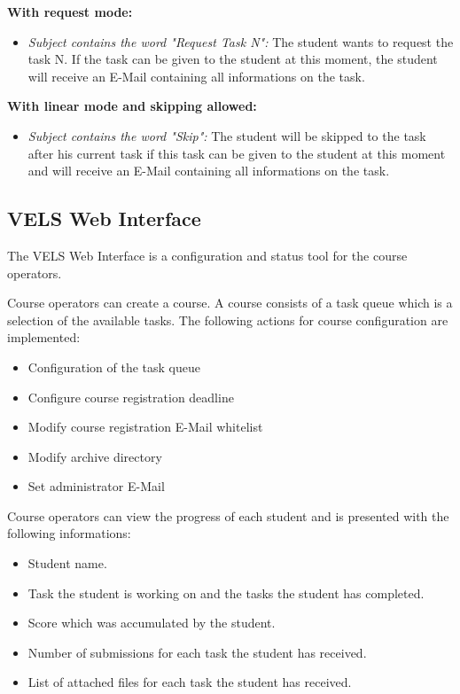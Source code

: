 \textbf{With request mode:}
\begin{itemize}
\item \textit{Subject contains the word "Request Task N":} The student wants to request the task N. If the task can be 
	given to the student at this moment, the student will receive an E-Mail containing all informations on the task.
\end{itemize}

\textbf{With linear mode and skipping allowed:}
\begin{itemize}
\item \textit{Subject contains the word "Skip":} The student will be skipped to the task after his current task if 
	this task can be given to the student at this moment and will receive an E-Mail containing all informations on 
	the task.
\end{itemize}


\subsection{VELS Web Interface}\label{webinterface}

The VELS Web Interface is a configuration and status tool for the course operators.

Course operators can create a course. A course consists of a task queue which is a selection of the available tasks.
The following actions for course configuration  are implemented:
\begin{itemize}
\item Configuration of the task queue
\item Configure course registration deadline
\item Modify course registration E-Mail whitelist 
\item Modify archive directory
\item Set administrator E-Mail
\end{itemize}

Course operators can view the progress of each student and is presented with the following informations:
\begin{itemize}
\item Student name.
\item Task the student is working on and the tasks the student has completed.
\item Score which was accumulated by the student.
\item Number of submissions for each task the student has received.
\item List of attached files for each task the student has received.
\end{itemize}

